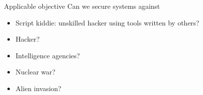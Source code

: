 \documentclass{beamer}
\begin{document}
\begin{frame}[t]{Applicable objective}
  Can we secure systems against
\begin{itemize}
\item<2-> Script kiddie: unskilled hacker using tools written by others?
\item<3-> Hacker?
\item<4-> Intelligence agencies?
\item<5-> Nuclear war?
\item<6-> Alien invasion?
\end{itemize}
\begin{center}
\end{center}
\end{frame}
\end{document}
